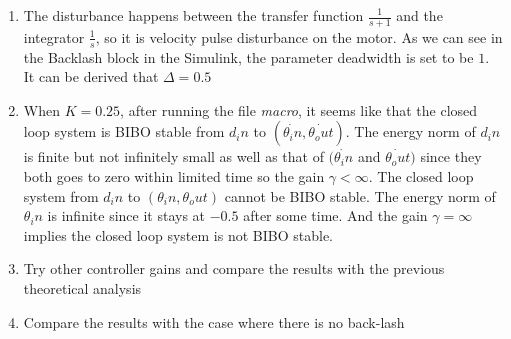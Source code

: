 \begin{enumerate}
  \item The disturbance happens between the transfer function $\frac{1}{s+1}$ and the integrator $\frac{1}{s}$, so it is velocity pulse disturbance on the motor. 
  As we can see in the Backlash block in the Simulink, the parameter deadwidth is set to be $1$. It can be derived that $\Delta=0.5$   
  \item When $K=0.25$, after running the file \textit{macro}, it seems like that the closed loop system is BIBO stable from $d_in$ to $(\dot{\theta_in},\dot{\theta_out})$. The energy norm of $d_in$ is finite but not infinitely small as well as that of $(\dot{\theta_in}$ and $\dot{\theta_out})$ since they both goes to zero within limited time so the gain $\gamma<\infty$.
   The closed loop system from $d_in$ to $(\theta_in,\theta_out)$ cannot be BIBO stable. The energy norm of $\theta_in$ is infinite since it stays at $-0.5$ after some time. And the gain $\gamma=\infty$ implies the closed loop system is not BIBO stable.  
  \item Try other controller gains and compare the results with the previous theoretical analysis
  \item Compare the results with the case where there is no back-lash
\end{enumerate}




